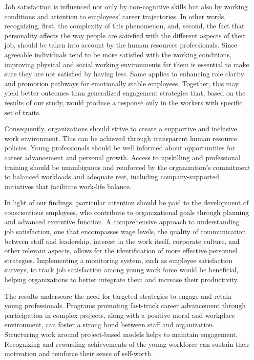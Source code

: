 \documentclass[
]{interact}
\begin{document}
Job satisfaction is influenced not only by non-cognitive skills but also
by working conditions and attention to employees' career trajectories.
In other words, recognizing, first, the complexity of this phenomenon,
and, second, the fact that personality affects the way people are
satisfied with the different aspects of their job, should be taken into
account by the human resources professionals. Since agreeable
individuals tend to be more satisfied with the working conditions,
improving physical and social working environments for them is essential
to make sure they are not satisfied by having less. Same applies to
enhancing role clarity and promotion pathways for emotionally stable
employees. Together, this may yield better outcomes than generalized
engagement strategies that, based on the results of our study, would
produce a response only in the workers with specific set of traits.

Consequently, organizations should strive to create a supportive and
inclusive work environment. This can be achieved through transparent
human resource policies. Young professionals should be well informed
about opportunities for career advancement and personal growth. Access
to upskilling and professional training should be unambiguous and
reinforced by the organization's commitment to balanced workloads and
adequate rest, including company-supported initiatives that facilitate
work-life balance.

In light of our findings, particular attention should be paid to the
development of conscientious employees, who contribute to organizational
goals through planning and advanced executive function. A comprehensive
approach to understanding job satisfaction, one that encompasses wage
levels, the quality of communication between staff and leadership,
interest in the work itself, corporate culture, and other relevant
aspects, allows for the identification of more effective personnel
strategies. Implementing a monitoring system, such as employee
satisfaction surveys, to track job satisfaction among young work force
would be beneficial, helping organizations to better integrate them and
increase their productivity.

The results underscore the need for targeted strategies to engage and
retain young professionals. Programs promoting fast-track career
advancement through participation in complex projects, along with a
positive moral and workplace environment, can foster a strong bond
between staff and organization. Structuring work around project-based
models helps to maintain engagement. Recognizing and rewarding
achievements of the young workforce can sustain their motivation and
reinforce their sense of self-worth.
\end{document}
